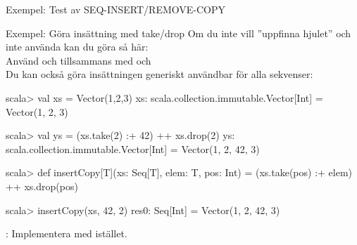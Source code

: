 \begin{Slide}{Exempel: Test av SEQ-INSERT/REMOVE-COPY}
\vspace{-0.6em}
\end{Slide}

\begin{Slide}{Exempel: Göra insättning med take/drop}\SlideFontSmall
Om du inte vill ''uppfinna hjulet'' och inte använda  kan du göra så här: \\Använd  och  tillsammans med \code{:+} och \code{++} \\Du kan också göra insättningen generiskt användbar för alla sekvenser:
\begin{REPLnonum}
scala> val xs = Vector(1,2,3)
xs: scala.collection.immutable.Vector[Int] =
  Vector(1, 2, 3)

scala> val ys = (xs.take(2) :+ 42) ++ xs.drop(2)
ys: scala.collection.immutable.Vector[Int] =
  Vector(1, 2, 42, 3)

scala> def insertCopy[T](xs: Seq[T], elem: T, pos: Int) =
        (xs.take(pos) :+ elem) ++ xs.drop(pos)

scala> insertCopy(xs, 42, 2)
res0: Seq[Int] = Vector(1, 2, 42, 3)

\end{REPLnonum}
: Implementera  med  istället.
\end{Slide}
